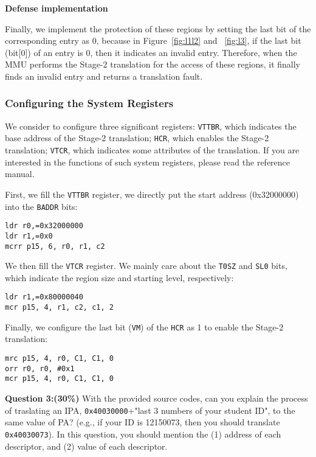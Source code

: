 \vspace{10pt}
\textbf{Defense implementation}
\vspace{10pt}



Finally, we implement the protection of these regions by setting the last bit of the corresponding entry as 0, because in Figure~\ref{fig:l1l2} and ~\ref{fig:l3}, if the last bit (bit[0]) of an entry is 0, then it indicates an invalid entry. Therefore, when the MMU performs the Stage-2 translation for the access of these regions, it finally finds an invalid entry and returns a translation fault.

\subsubsection{Configuring the System Registers}
We consider to configure three significant registers: \texttt{VTTBR}, which indicates the base address of the Stage-2 translation; \texttt{HCR}, which enables the Stage-2 translation; \texttt{VTCR}, which indicates some attributes of the translation. If you are interested in the functions of such system registers, please read the reference manual.

First, we fill the \texttt{VTTBR} register, we directly put the start address (0x32000000) into the \texttt{BADDR} bits:

\begin{lstlisting}
ldr r0,=0x32000000
ldr r1,=0x0
mcrr p15, 6, r0, r1, c2
\end{lstlisting}


We then fill the \texttt{VTCR} register. We mainly care about the \texttt{T0SZ} and \texttt{SL0} bits, which indicate the region size and starting level, respectively:

\begin{lstlisting}
ldr r1,=0x80000040
mcr p15, 4, r1, c2, c1, 2
\end{lstlisting}

Finally, we configure the last bit (\texttt{VM}) of the \texttt{HCR} as 1 to enable the Stage-2 translation:

\begin{lstlisting}
mrc p15, 4, r0, C1, C1, 0 
orr	r0, r0, #0x1
mcr p15, 4, r0, C1, C1, 0
\end{lstlisting}

\textbf{Question 3:(30\%)} With the provided source codes, can you 
explain 
the process of traslating an IPA, \texttt{0x40030000}+"last 3 numbers 
of your student ID", to the same value of PA? (e.g., if your ID is 
12150073, then you should translate \texttt{0x40030073}).
In this question, you should mention the (1) address of each 
descriptor, and (2) value of each descriptor. 


